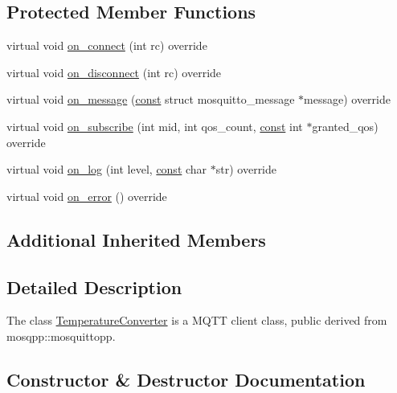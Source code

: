 \subsection*{Protected Member Functions}
\begin{DoxyCompactItemize}
\item 
virtual void \hyperlink{class_temperature_converter_a2873aa81d1480326e797333649ad7612}{on\+\_\+connect} (int rc) override
\item 
virtual void \hyperlink{class_temperature_converter_aed2c87d3bea3cdc71b16932a5deb685a}{on\+\_\+disconnect} (int rc) override
\item 
virtual void \hyperlink{class_temperature_converter_abe798ee6c4861d708fdbf845682a55f4}{on\+\_\+message} (\hyperlink{functions__c_8js_afacfd9c985d225bb07483b887a801b6f}{const} struct mosquitto\+\_\+message $\ast$message) override
\item 
virtual void \hyperlink{class_temperature_converter_a19e82377ed204cd11e63df20368c7c07}{on\+\_\+subscribe} (int mid, int qos\+\_\+count, \hyperlink{functions__c_8js_afacfd9c985d225bb07483b887a801b6f}{const} int $\ast$granted\+\_\+qos) override
\item 
virtual void \hyperlink{class_temperature_converter_a570e3818402e2bbba5d5ecb6529423f3}{on\+\_\+log} (int level, \hyperlink{functions__c_8js_afacfd9c985d225bb07483b887a801b6f}{const} char $\ast$str) override
\item 
virtual void \hyperlink{class_temperature_converter_ac7fc38707aea9dc09145de054c89ffd1}{on\+\_\+error} () override
\end{DoxyCompactItemize}
\subsection*{Additional Inherited Members}


\subsection{Detailed Description}
The class \hyperlink{class_temperature_converter}{Temperature\+Converter} is a M\+Q\+TT client class, public derived from mosqpp\+::mosquittopp. 

\subsection{Constructor \& Destructor Documentation}
